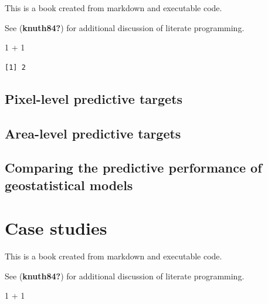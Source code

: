 \documentclass[
  letterpaper,
]{krantz}
\newenvironment{Shaded}{\begin{snugshade}}{\end{snugshade}}
\newcommand{\DecValTok}[1]{\textcolor[rgb]{0.68,0.00,0.00}{#1}}
\newcommand{\SpecialCharTok}[1]{\textcolor[rgb]{0.37,0.37,0.37}{#1}}
\begin{document}
This is a book created from markdown and executable code.

See (\textbf{knuth84?}) for additional discussion of literate
programming.

\begin{Shaded}
\begin{Highlighting}[]
\DecValTok{1} \SpecialCharTok{+} \DecValTok{1}
\end{Highlighting}
\end{Shaded}

\begin{verbatim}
[1] 2
\end{verbatim}

\hypertarget{pixel-level-predictive-targets}{%
\section{Pixel-level predictive
targets}\label{pixel-level-predictive-targets}}

\hypertarget{area-level-predictive-targets}{%
\section{Area-level predictive
targets}\label{area-level-predictive-targets}}

\hypertarget{comparing-the-predictive-performance-of-geostatistical-models}{%
\section{Comparing the predictive performance of geostatistical
models}\label{comparing-the-predictive-performance-of-geostatistical-models}}


\hypertarget{sec-case-studies}{%
\chapter{Case studies}\label{sec-case-studies}}

This is a book created from markdown and executable code.

See (\textbf{knuth84?}) for additional discussion of literate
programming.

\begin{Shaded}
\begin{Highlighting}[]
\DecValTok{1} \SpecialCharTok{+} \DecValTok{1}
\end{Highlighting}
\end{Shaded}
\end{document}
